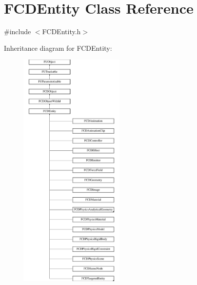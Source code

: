 \hypertarget{classFCDEntity}{
\section{FCDEntity Class Reference}
\label{classFCDEntity}
}


{\ttfamily \#include $<$FCDEntity.h$>$}

Inheritance diagram for FCDEntity:\begin{figure}[H]
\begin{center}
\leavevmode
\includegraphics[height=12.000000cm]{classFCDEntity}
\end{center}
\end{figure}
